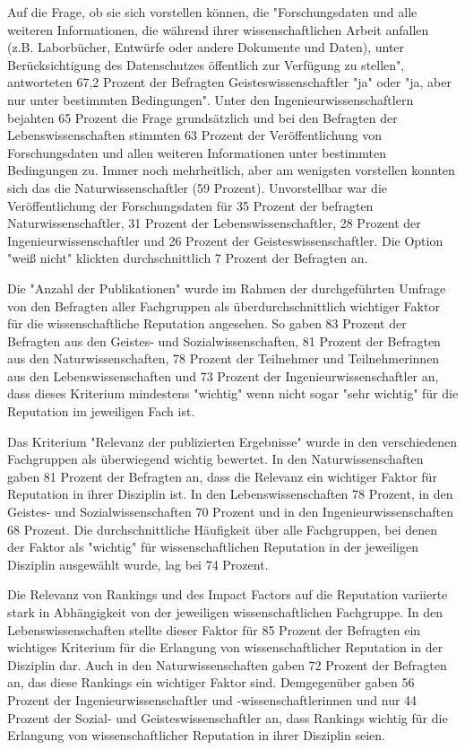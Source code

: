 Auf die Frage, ob sie sich vorstellen können, die "Forschungsdaten und alle weiteren Informationen, die während ihrer wissenschaftlichen Arbeit anfallen (z.B. Laborbücher, Entwürfe oder andere Dokumente und Daten), unter Berücksichtigung des Datenschutzes öffentlich zur Verfügung zu stellen", antworteten 67,2 Prozent der Befragten Geisteswissenschaftler "ja" oder "ja, aber nur unter bestimmten Bedingungen". Unter den Ingenieurwissenschaftlern bejahten 65 Prozent die Frage grundsätzlich und bei den Befragten der Lebenswissenschaften stimmten 63 Prozent der Veröffentlichung von Forschungsdaten und allen weiteren Informationen unter bestimmten Bedingungen zu. Immer noch mehrheitlich, aber am wenigsten vorstellen konnten sich das die Naturwissenschaftler (59 Prozent). Unvorstellbar war die Veröffentlichung der Forschungsdaten für 35 Prozent der befragten Naturwissenschaftler, 31 Prozent der Lebenswissenschaftler, 28 Prozent der Ingenieurwissenschaftler und 26 Prozent der Geisteswissenschaftler. Die Option "weiß nicht" klickten durchschnittlich 7 Prozent der Befragten an.

Die "Anzahl der Publikationen" wurde im Rahmen der durchgeführten Umfrage von den Befragten aller Fachgruppen als überdurchschnittlich wichtiger Faktor für die wissenschaftliche Reputation angesehen. So gaben 83 Prozent der Befragten aus den Geistes- und Sozialwissenschaften, 81 Prozent der Befragten aus den Naturwissenschaften, 78 Prozent der Teilnehmer und Teilnehmerinnen aus den Lebenswissenschaften und 73 Prozent der Ingenieurwissenschaftler an, dass dieses Kriterium mindestens "wichtig" wenn nicht sogar "sehr wichtig" für die Reputation im jeweiligen Fach ist.

Das Kriterium "Relevanz der publizierten Ergebnisse" wurde in den verschiedenen Fachgruppen als überwiegend wichtig bewertet. In den Naturwissenschaften gaben 81 Prozent der Befragten an, dass die Relevanz ein wichtiger Faktor für Reputation in ihrer Disziplin ist. In den Lebenswissenschaften 78 Prozent, in den Geistes- und Sozialwissenschaften 70 Prozent und in den Ingenieurwissenschaften 68 Prozent. Die durchschnittliche Häufigkeit über alle Fachgruppen, bei denen der Faktor als "wichtig" für wissenschaftlichen Reputation in der jeweiligen Disziplin ausgewählt wurde, lag bei 74 Prozent.

Die Relevanz von Rankings und des Impact Factors auf die Reputation variierte stark in Abhängigkeit von der jeweiligen wissenschaftlichen Fachgruppe. In den Lebenswissenschaften stellte dieser Faktor für 85 Prozent der Befragten ein wichtiges Kriterium für die Erlangung von wissenschaftlicher Reputation in der Disziplin dar. Auch in den Naturwissenschaften gaben 72 Prozent der Befragten an, das diese Rankings ein wichtiger Faktor sind. Demgegenüber gaben 56 Prozent der Ingenieurwissenschaftler und -wissenschaftlerinnen und nur 44 Prozent der Sozial- und Geisteswissenschaftler an, dass Rankings wichtig für die Erlangung von wissenschaftlicher Reputation in ihrer Disziplin seien.


